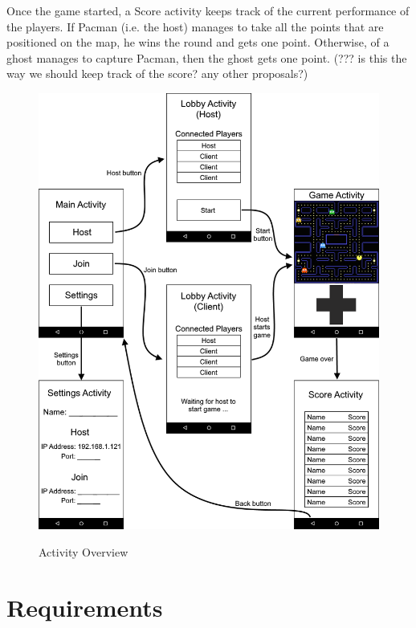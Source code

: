 \documentclass{report}
\newcommand{\lfig}[1]{\label{fig:#1}}
\begin{document}
Once the game started, a Score activity keeps track of the current performance of the players. If Pacman (i.e. the host) manages to take all the points that are positioned on the map, he wins the round and gets one point. Otherwise, of a ghost manages to capture Pacman, then the ghost gets one point. (??? is this the way we should keep track of the score? any other proposals?)

\begin{figure} [ht!]
	\centering
    \includegraphics[width=\columnwidth]{overview.png}
    \lfig{activity-overview}
    \vspace{-5mm} %
	\caption{Activity Overview}
\end{figure}

\section{Requirements}

\end{document}
